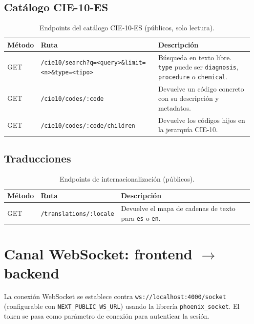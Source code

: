 \subsection{Catálogo CIE-10-ES}

\begin{table}[h]
\centering
\caption{Endpoints del catálogo CIE-10-ES (públicos, solo lectura).}
\label{tab:api-cie10}
\begin{tabular}{lp{5cm}p{5cm}}
\hline
\textbf{Método} & \textbf{Ruta} & \textbf{Descripción} \\
\hline
GET & \texttt{/cie10/search?\allowbreak{}q=<query>\&\allowbreak{}limit=<n>\&\allowbreak{}type=<tipo>} & Búsqueda en texto libre. \texttt{type} puede ser \texttt{diagnosis}, \texttt{procedure} o \texttt{chemical}. \\
GET & \texttt{/cie10/codes/:code} & Devuelve un código concreto con su descripción y metadatos. \\
GET & \texttt{/cie10/codes/\allowbreak{}:code/children} & Devuelve los códigos hijos en la jerarquía CIE-10. \\
\hline
\end{tabular}
\end{table}

\subsection{Traducciones}

\begin{table}[h]
\centering
\caption{Endpoints de internacionalización (públicos).}
\label{tab:api-i18n}
\begin{tabular}{llp{7cm}}
\hline
\textbf{Método} & \textbf{Ruta} & \textbf{Descripción} \\
\hline
GET & \texttt{/translations/:locale} & Devuelve el mapa de cadenas de texto para \texttt{es} o \texttt{en}. \\
\hline
\end{tabular}
\end{table}

\section{Canal WebSocket: frontend \texorpdfstring{$\rightarrow$}{->} backend}

La conexión WebSocket se establece contra \texttt{ws://localhost:4000/socket} (configurable con \texttt{NEXT\_PUBLIC\_WS\_URL}) usando la librería \texttt{phoenix\_socket}. El token se pasa como parámetro de conexión para autenticar la sesión.

